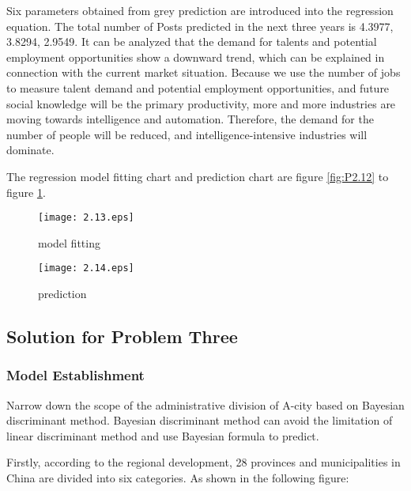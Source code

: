\documentclass{mcmthesis}
\begin{document}
\par\noindent
Six parameters obtained from grey prediction are introduced into the regression equation. The total number of Posts predicted in the next three years is {4.3977, 3.8294, 2.9549}. It can be analyzed that the demand for talents and potential employment opportunities show a downward trend, which can be explained in connection with the current market situation. Because we use the number of jobs to measure talent demand and potential employment opportunities, and future social knowledge will be the primary productivity, more and more industries are moving towards intelligence and automation. Therefore, the demand for the number of people will be reduced, and intelligence-intensive industries will dominate.
\par\noindent
The regression model fitting chart and prediction chart are figure \ref{fig:P2.12} to figure \ref{fig:P2.14}.
\begin{figure}[h]
	\begin{minipage}[h]{0.5\linewidth}
		\centering
		\texttt{[image: 2.13.eps]}
		\caption{model fitting}
		\label{fig:P2.13}
	\end{minipage}
	\begin{minipage}[h]{0.5\linewidth}
		\centering
		\texttt{[image: 2.14.eps]}
		\caption{prediction}
		\label{fig:P2.14}
	\end{minipage}
\end{figure}

\subsection{Solution for Problem Three}
\subsubsection{Model Establishment}
 Narrow down the scope of the administrative division of A-city based on Bayesian discriminant method. Bayesian discriminant method can avoid the limitation of linear discriminant method and use Bayesian formula to predict.

\par\noindent
 Firstly, according to the regional development, 28 provinces and municipalities in China are divided into six categories. As shown in the following figure:
\end{document}
